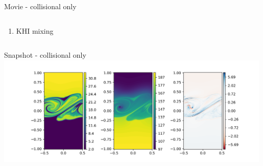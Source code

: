 \documentclass[10pt,aspectratio=169,usenames,dvipsnames]{beamer}
\begin{document}


\begin{frame}{Movie - collisional only}
\begin{columns}
\begin{column}{0.5\textwidth}
\begin{enumerate}
\item KHI mixing
\end{enumerate}
\end{column}
\begin{column}{0.5\textwidth}

\end{column}
\end{columns}
\end{frame}

\begin{frame}{Snapshot - collisional only}
\includegraphics[width=0.99\textwidth]{2023Mixing/Figures/KHInlev_testplot2.png}
\end{frame}
\end{document}
